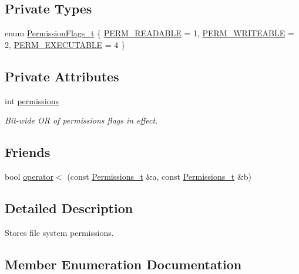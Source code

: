 \subsection*{Private Types}
\begin{DoxyCompactItemize}
\item 
enum \hyperlink{struct_permissions__t_a3b8be006ad2be82fc04665c5d54731b4}{Permission\+Flags\+\_\+t} \{ \hyperlink{struct_permissions__t_a3b8be006ad2be82fc04665c5d54731b4ae75898ca7731933e40e9b65b695ff29f}{P\+E\+R\+M\+\_\+\+R\+E\+A\+D\+A\+B\+LE} = 1, 
\hyperlink{struct_permissions__t_a3b8be006ad2be82fc04665c5d54731b4a7feb36bc0125174fd6b98245ad937091}{P\+E\+R\+M\+\_\+\+W\+R\+I\+T\+E\+A\+B\+LE} = 2, 
\hyperlink{struct_permissions__t_a3b8be006ad2be82fc04665c5d54731b4add0498a8bcf736dede803a4a97e13b1c}{P\+E\+R\+M\+\_\+\+E\+X\+E\+C\+U\+T\+A\+B\+LE} = 4
 \}
\end{DoxyCompactItemize}
\subsection*{Private Attributes}
\begin{DoxyCompactItemize}
\item 
int \hyperlink{struct_permissions__t_a35bf4571b0a4861f281fc7cad753881e}{permissions}
\begin{DoxyCompactList}\small\item\em Bit-\/wide OR of permissions flags in effect. \end{DoxyCompactList}\end{DoxyCompactItemize}
\subsection*{Friends}
\begin{DoxyCompactItemize}
\item 
bool \hyperlink{struct_permissions__t_a215e1c6bd16dc184cc10a24ca7d37a8d}{operator$<$} (const \hyperlink{struct_permissions__t}{Permissions\+\_\+t} \&a, const \hyperlink{struct_permissions__t}{Permissions\+\_\+t} \&b)
\end{DoxyCompactItemize}


\subsection{Detailed Description}
Stores file system permissions. 

\subsection{Member Enumeration Documentation}

